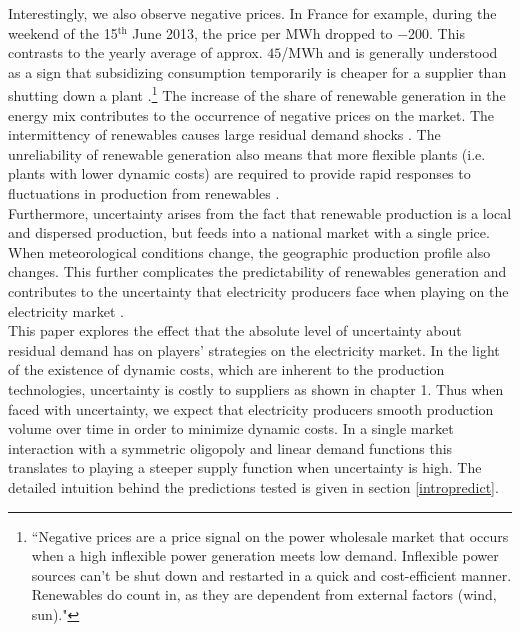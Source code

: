 Interestingly, we also observe negative prices. In France for example, during the weekend of the 15$^\text{th}$ June 2013, the price per MWh dropped to $-200$\EUR{}. This contrasts to the yearly average of approx. $ 45$\EUR{}/MWh and is generally understood as a sign that subsidizing consumption temporarily is cheaper for a supplier than shutting down a plant \cite{epexwebsite1}.\footnote{``Negative prices are a price signal on the power wholesale market that occurs when a high inflexible power generation meets low demand. Inflexible power sources can’t be shut down and restarted in a quick and cost-efficient manner. Renewables do count in, as they are dependent from external factors (wind, sun)."}  The increase of the share of renewable generation in the energy mix contributes to the occurrence of negative prices on the market. 
The intermittency of renewables causes large residual demand shocks \cite{epexwebsite1}. The unreliability of renewable generation also means that more flexible plants (i.e. plants with lower dynamic costs) are required to provide rapid responses to fluctuations in production from renewables \cite{ren2013renewables}. \\

Furthermore, uncertainty arises from the fact that renewable production is a local and dispersed production, but feeds into a national market with a single price. When meteorological conditions change, the geographic production profile also changes. This further complicates the predictability of renewables generation and contributes to the uncertainty that electricity producers face when playing %
on the electricity %
market \cite{meibom2009operational}.\\

This paper explores the effect that the absolute level of uncertainty about residual demand has on players' strategies on the electricity market. In the light of the existence of dynamic costs, which are inherent to the production technologies, uncertainty is costly to suppliers as shown in chapter 1. Thus when faced with uncertainty, we expect that electricity producers smooth production volume over time in order to minimize dynamic costs. In a single market interaction with a symmetric oligopoly and linear demand functions this translates to playing a steeper supply function when uncertainty is high. The detailed intuition behind the predictions tested is given in section \ref{intropredict}. \\

